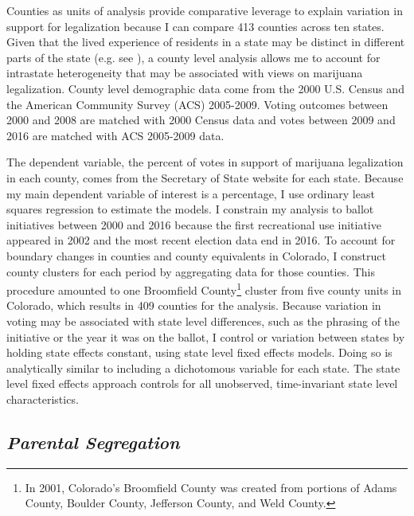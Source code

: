 Counties as units of analysis provide comparative leverage to explain variation in support for legalization because I can compare 413 counties across ten states. Given that the lived experience of residents in a state may be distinct in different parts of the state (e.g. see \citealt{mcveigh_and_sobolewski_2007}), a county level analysis allows me to account for intrastate heterogeneity that may be associated with views on marijuana legalization. County level demographic data come from the 2000 U.S. Census and the American Community Survey (ACS) 2005-2009. Voting outcomes between 2000 and 2008 are matched with 2000 Census data and votes between 2009 and 2016 are matched with ACS 2005-2009 data. 

The dependent variable, the percent of votes in support of marijuana legalization in each county, comes from the Secretary of State website for each state. Because my main dependent variable of interest is a percentage, I use ordinary least squares regression to estimate the models. I constrain my analysis to ballot initiatives between 2000 and 2016 because the first recreational use initiative appeared in 2002 and the most recent election data end in 2016. To account for boundary changes in counties and county equivalents in Colorado, I construct county clusters for each period by aggregating data for those counties. This procedure amounted to one Broomfield County\footnote{In 2001, Colorado's Broomfield County was created from portions of Adams County, Boulder County, Jefferson County, and Weld County.} cluster from five county units in Colorado, which results in 409 counties for the analysis. Because variation in voting may be associated with state level differences, such as the phrasing of the initiative or the year it was on the ballot, I control or variation between states by holding state effects constant, using state level fixed effects models. Doing so is analytically similar to including a dichotomous variable for each state. The state level fixed effects approach controls for all unobserved, time-invariant state level characteristics.

\subsection{\it{Parental Segregation}}

